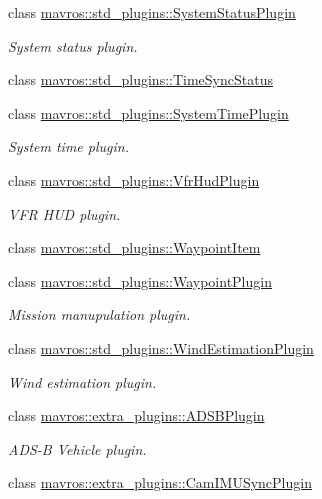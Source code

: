 \begin{DoxyCompactItemize}
class \mbox{\hyperlink{classmavros_1_1std__plugins_1_1SystemStatusPlugin}{mavros\+::std\+\_\+plugins\+::\+System\+Status\+Plugin}}
\begin{DoxyCompactList}\small\item\em System status plugin. \end{DoxyCompactList}\item 
class \mbox{\hyperlink{classmavros_1_1std__plugins_1_1TimeSyncStatus}{mavros\+::std\+\_\+plugins\+::\+Time\+Sync\+Status}}
\item 
class \mbox{\hyperlink{classmavros_1_1std__plugins_1_1SystemTimePlugin}{mavros\+::std\+\_\+plugins\+::\+System\+Time\+Plugin}}
\begin{DoxyCompactList}\small\item\em System time plugin. \end{DoxyCompactList}\item 
class \mbox{\hyperlink{classmavros_1_1std__plugins_1_1VfrHudPlugin}{mavros\+::std\+\_\+plugins\+::\+Vfr\+Hud\+Plugin}}
\begin{DoxyCompactList}\small\item\em V\+FR H\+UD plugin. \end{DoxyCompactList}\item 
class \mbox{\hyperlink{classmavros_1_1std__plugins_1_1WaypointItem}{mavros\+::std\+\_\+plugins\+::\+Waypoint\+Item}}
\item 
class \mbox{\hyperlink{classmavros_1_1std__plugins_1_1WaypointPlugin}{mavros\+::std\+\_\+plugins\+::\+Waypoint\+Plugin}}
\begin{DoxyCompactList}\small\item\em Mission manupulation plugin. \end{DoxyCompactList}\item 
class \mbox{\hyperlink{classmavros_1_1std__plugins_1_1WindEstimationPlugin}{mavros\+::std\+\_\+plugins\+::\+Wind\+Estimation\+Plugin}}
\begin{DoxyCompactList}\small\item\em Wind estimation plugin. \end{DoxyCompactList}\item 
class \mbox{\hyperlink{classmavros_1_1extra__plugins_1_1ADSBPlugin}{mavros\+::extra\+\_\+plugins\+::\+A\+D\+S\+B\+Plugin}}
\begin{DoxyCompactList}\small\item\em A\+D\+S-\/B Vehicle plugin. \end{DoxyCompactList}\item 
class \mbox{\hyperlink{classmavros_1_1extra__plugins_1_1CamIMUSyncPlugin}{mavros\+::extra\+\_\+plugins\+::\+Cam\+I\+M\+U\+Sync\+Plugin}}

\end{DoxyCompactItemize}
